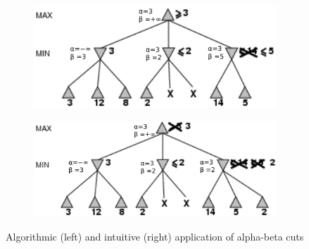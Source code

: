 \begin{figure}[h]
\begin{subfigure}{.4\textwidth}
    \end{subfigure}
    \begin{subfigure}{.4\textwidth}
        \centering
        \includegraphics[width=\linewidth]{img/alphabeta_algo_example4.png}
    \end{subfigure}
    \begin{subfigure}{.4\textwidth}
        \centering
        \includegraphics[width=\linewidth]{img/alphabeta_algo_example5.png}
    \end{subfigure}
    \caption{Algorithmic (left) and intuitive (right) application of alpha-beta cuts}
\end{figure}